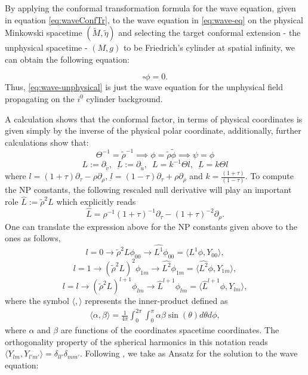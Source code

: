 \documentclass[
11pt, %
english, %
singlespacing, %
headsepline, %
]{MastersDoctoralThesis} %
\begin{document}
\bigskip

By applying the conformal transformation formula for the wave equation, given in equation \eqref{eq:waveConfTr}, to the wave equation in \eqref{eq:wave-eq} on the physical Minkowski spacetime $(\tilde{M} , \tilde{\eta})$ and selecting the target conformal extension - the unphysical spacetime - $(M, g)$ to be Friedrich's cylinder at spatial infinity, we can obtain the following equation:

\begin{equation}\label{eq:wave-unphysical}
	\square \phi = 0.
\end{equation}
Thus, \eqref{eq:wave-unphysical} is just the wave equation for the unphysical field propagating on the $i^0$ cylinder background.

\medskip

A calculation shows that the conformal factor, in terms of physical
coordinates is given simply by the inverse of the physical polar
coordinate, additionally, further calculations show that:
$$\Theta^{-1} = \tilde{\rho}^{-1} \implies \phi =
\tilde{\rho}\tilde{\phi} \implies \psi = \phi$$
$$ \textit{L} := \partial_{\tilde{v}}, \enspace
\underbar{\textit{L}}:= \partial_{\tilde{u}}, \enspace L =
k^{-1}\Theta l, \enspace \underbar{\textit{L}} = k\Theta l$$ where $l
= (1+\tau)\partial_{\tau}-\rho \partial_{\rho}$,
$\underbar{\textit{l}} = (1-\tau)\partial_{\tau}+\rho
\partial_{\rho}$ and $k = \frac{(1+\tau)}{(1-\tau)}$.  To compute the NP constants, the following rescaled
null derivative will play an important role $\hat{L}:=
\tilde{\rho}^2L$ which explicitly reads
\begin{equation}\label{eq:operator}
  \hat{L} = \rho^{-1}(1+\tau)^{-1}\partial_{\tau} -
  (1+\tau)^{-2}\partial_{\rho}.
\end{equation}
One can translate the expression above for the NP constants given
above to the ones as follows,
$$l = 0 \rightarrow \tilde{\rho}^2L\phi_{00} \rightarrow
\hat{L^{1}}\phi_{00} = \langle \hat{L^1}\phi,Y_{00}\rangle,$$
$$l = 1 \rightarrow (\tilde{\rho}^2L)^2\phi_{1m} \rightarrow
\hat{L^{2}}\phi_{1m} = \langle \hat{L^2}\phi,Y_{1m}\rangle,$$
$$l = l \rightarrow (\tilde{\rho}^2L)^{l+1}\phi_{lm} \rightarrow
\hat{L}^{l+1}\phi_{lm} = \langle \hat{L}^{l+1}\phi,Y_{lm}\rangle,$$
where the symbol $\langle,\rangle$ represents the inner-product defined as
\begin{align}\label{innerprod}
  \langle \alpha, \beta \rangle = \frac{1}{4\pi}\int_0^{2\pi}\int_0^\pi \alpha \beta \sin(\theta)d\theta d\phi,
\end{align}
where $\alpha$ and $\beta$ are functions of the coordinates spacetime coordinates.
The orthogonality property of the spherical harmonics in this notation reads
$\langle Y_{lm}, Y_{l'm'}\rangle = \delta_{ll'}\delta_{mm'}$.
Following \cite{MinMacKro22}, we take as Ansatz for the solution to
the wave equation:
\end{document}
